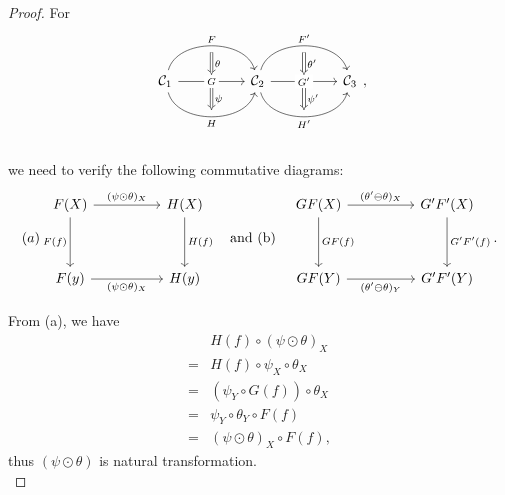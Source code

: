 \documentclass{article}
\begin{document}
\begin{proof}
	For
	\[\begin{tikzcd}
		\C_1
		\arrow[bend left=75, rr, "F", ""' name=F] \arrow[rr, "G" description, "" name=G, ""' name=GG] \arrow[bend right=75, rr, "H"', "" name=H] & &
		\arrow[Rightarrow, from=F, to=G, "\theta"] \arrow[Rightarrow, from=GG, to=H, "\psi"]
		\C_2 \arrow[bend left=75, rr, "F'", ""' name=F'] \arrow[rr, "G'" description, "" name=G', ""' name=GG'] \arrow[bend right=75, rr, "H'"', "" name=H'] & &
		\arrow[Rightarrow, from=F', to=G', "\theta'"] \arrow[Rightarrow, from=GG', to=H', "\psi'"] \C_3
	\end{tikzcd},\]\\
	we need to verify the following commutative diagrams:
		\[(a)\begin{tikzcd}
				F(X) \arrow[dd,"F(f)"'] \arrow[rr,"(\psi\odot\theta)_X"] && H(X) \arrow[dd,"H(f)"]\\ && \\
				F(y) \arrow[rr,"(\psi\odot\theta)_X"'] && H(y)
			\end{tikzcd}\quad\text{and (b)}\quad\begin{tikzcd}
				GF(X) \arrow[dd,"GF(f)"] \arrow[rr,"(\theta'\ominus\theta)_X"] && G'F'(X) \arrow[dd,"G'F'(f)"]\\ && \\
				GF(Y) \arrow[rr,"(\theta'\ominus\theta)_Y"'] && G'F'(Y)
			\end{tikzcd}.\]
		
		From (a), we have
		\begin{align}
			 & H(f)\circ(\psi\odot\theta)_X\tag{Assumption}\\
			=& H(f)\circ\psi_X\circ\theta_X\tag{Def: longitudinal composition}\\
			=& (\psi_Y\circ G(f))\circ\theta_X\tag{Property of natural transformation $\psi$}\\
			=& \psi_Y\circ\theta_Y\circ F(f)\tag{Property of natural transformation $\theta$}\\
			=& (\psi\odot\theta)_X\circ F(f),\tag{Def: longitudinal composition}
		\end{align}
		thus $(\psi\odot\theta)$ is natural transformation.\\
		

\end{proof}
\end{document}
